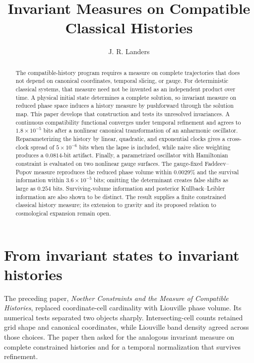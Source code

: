 \documentclass[10pt]{article}
\title{\vspace{-2.3em}\textbf{Invariant Measures on Compatible Classical Histories}}
\author{J. R. Landers}
\date{}
\begin{document}
\maketitle
\vspace{-1.25em}

\begin{abstract}
The compatible-history program requires a measure on complete trajectories
that does not depend on canonical coordinates, temporal slicing, or gauge.
For deterministic classical systems, that measure need not be invented as an
independent product over time.  A physical initial state determines a complete
solution, so invariant measure on reduced phase space induces a history
measure by pushforward through the solution map.  This paper develops that
construction and tests its unresolved invariances.  A continuous compatibility
functional converges under temporal refinement and agrees to
$1.8\times10^{-5}$ bits after a nonlinear canonical transformation of an
anharmonic oscillator.  Reparameterizing the history by linear, quadratic,
and exponential clocks gives a cross-clock spread of $5\times10^{-6}$ bits
when the lapse is included, while naive slice weighting produces a
$0.0814$-bit artifact.  Finally, a parametrized oscillator with Hamiltonian
constraint is evaluated on two nonlinear gauge surfaces.  The gauge-fixed
Faddeev--Popov measure reproduces the reduced phase volume within $0.0029\%$
and the survival information within $3.6\times10^{-5}$ bits; omitting the
determinant creates false shifts as large as $0.254$ bits.  Surviving-volume
information and posterior Kullback--Leibler information are also shown to be
distinct.  The result supplies a finite constrained classical history measure;
its extension to gravity and its proposed relation to cosmological expansion
remain open.
\end{abstract}

\section*{From invariant states to invariant histories}

The preceding paper, \emph{Noether Constraints and the Measure of Compatible
Histories}, replaced coordinate-cell cardinality with Liouville phase volume.
Its numerical tests separated two objects sharply.  Intersecting-cell counts
retained grid shape and canonical coordinates, while Liouville band density
agreed across those choices.  The paper then asked for the analogous invariant
measure on complete constrained histories and for a temporal normalization
that survives refinement.
\end{document}
